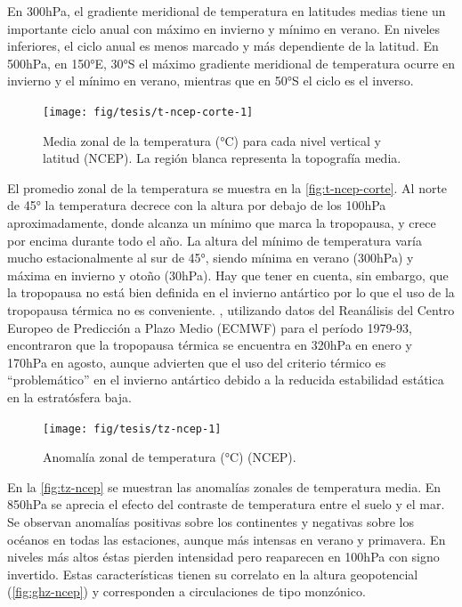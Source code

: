 \documentclass[spanish,a4paper,12pt,oneside]{book}
\begin{document}
En 300hPa, el gradiente meridional de temperatura en latitudes medias
tiene un importante ciclo anual con máximo en invierno y mínimo en
verano. En niveles inferiores, el ciclo anual es menos marcado y más
dependiente de la latitud. En 500hPa, en 150°E, 30°S el máximo gradiente
meridional de temperatura ocurre en invierno y el mínimo en verano,
mientras que en 50°S el ciclo es el inverso.

\begin{figure}
\texttt{[image: fig/tesis/t-ncep-corte-1]} \caption{Media zonal de la temperatura (°C) para cada nivel vertical y latitud (NCEP). La región blanca representa la topografía media.}\label{fig:t-ncep-corte}
\end{figure}

El promedio zonal de la temperatura se muestra en la
\autoref{fig:t-ncep-corte}. Al norte de 45° la temperatura decrece con
la altura por debajo de los 100hPa aproximadamente, donde alcanza un
mínimo que marca la tropopausa, y crece por encima durante todo el año.
La altura del mínimo de temperatura varía mucho estacionalmente al sur
de 45°, siendo mínima en verano (300hPa) y máxima en invierno y otoño
(30hPa). Hay que tener en cuenta, sin embargo, que la tropopausa no está
bien definida en el invierno antártico \citep{Court1942, Zangl2001} por
lo que el uso de la tropopausa térmica no es conveniente.
\citet{Zangl2001}, utilizando datos del Reanálisis del Centro Europeo de
Predicción a Plazo Medio (ECMWF) para el período 1979-93, encontraron
que la tropopausa térmica se encuentra en 320hPa en enero y 170hPa en
agosto, aunque advierten que el uso del criterio térmico es
``problemático'' en el invierno antártico debido a la reducida
estabilidad estática en la estratósfera baja.

\begin{landscape}\begin{figure}

{\centering \texttt{[image: fig/tesis/tz-ncep-1]} 

}

\caption{Anomalía zonal de temperatura (°C) (NCEP).}\label{fig:tz-ncep}
\end{figure}
\end{landscape}

En la \autoref{fig:tz-ncep} se muestran las anomalías zonales de
temperatura media. En 850hPa se aprecia el efecto del contraste de
temperatura entre el suelo y el mar. Se observan anomalías positivas
sobre los continentes y negativas sobre los océanos en todas las
estaciones, aunque más intensas en verano y primavera. En niveles más
altos éstas pierden intensidad pero reaparecen en 100hPa con signo
invertido. Estas características tienen su correlato en la altura
geopotencial (\autoref{fig:ghz-ncep}) y corresponden a circulaciones de
tipo monzónico.
\end{document}
